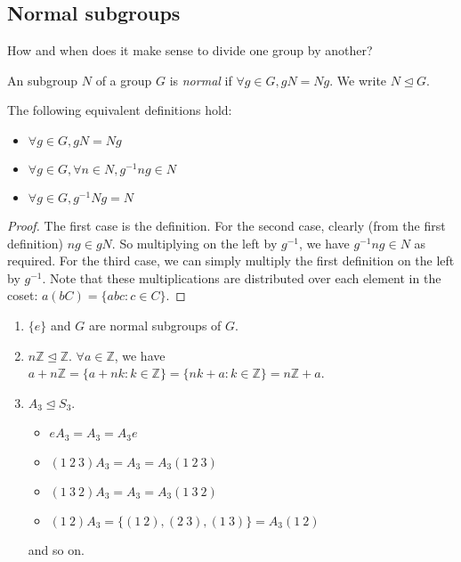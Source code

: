 \subsection{Normal subgroups}
How and when does it make sense to divide one group by another?
\begin{definition}
	An subgroup \(N\) of a group \(G\) is \textit{normal} if \(\forall g \in G, gN = Ng\).
	We write \(N \trianglelefteq G\).
\end{definition}
The following equivalent definitions hold:
\begin{itemize}
	\item \(\forall g \in G, gN = Ng\)
	\item \(\forall g \in G, \forall n \in N, g^{-1}ng \in N\)
	\item \(\forall g \in G, g^{-1}Ng = N\)
\end{itemize}
\begin{proof}
	The first case is the definition.
	For the second case, clearly (from the first definition) \(ng \in gN\).
	So multiplying on the left by \(g^{-1}\), we have \(g^{-1}ng \in N\) as required.
	For the third case, we can simply multiply the first definition on the left by \(g^{-1}\).
	Note that these multiplications are distributed over each element in the coset: \(a(bC) = \{ abc : c \in C \}\).
\end{proof}

\begin{enumerate}
	\item \(\{ e \}\) and \(G\) are normal subgroups of \(G\).
	\item \(n\mathbb Z \trianglelefteq \mathbb Z\).
	      \(\forall a \in \mathbb Z\), we have \(a + n\mathbb Z = \{ a + nk : k \in \mathbb Z \} = \{ nk + a : k \in \mathbb Z \} = n\mathbb Z + a\).
	\item \(A_3 \trianglelefteq S_3\).
	      \begin{itemize}
		      \item \(eA_3 = A_3 = A_3 e\)
		      \item \((1\ 2\ 3)A_3 = A_3 = A_3(1\ 2\ 3)\)
		      \item \((1\ 3\ 2)A_3 = A_3 = A_3(1\ 3\ 2)\)
		      \item \((1\ 2)A_3 = \{ (1\ 2), (2\ 3), (1\ 3) \} = A_3(1\ 2)\)
	      \end{itemize}
	      and so on.
\end{enumerate}

